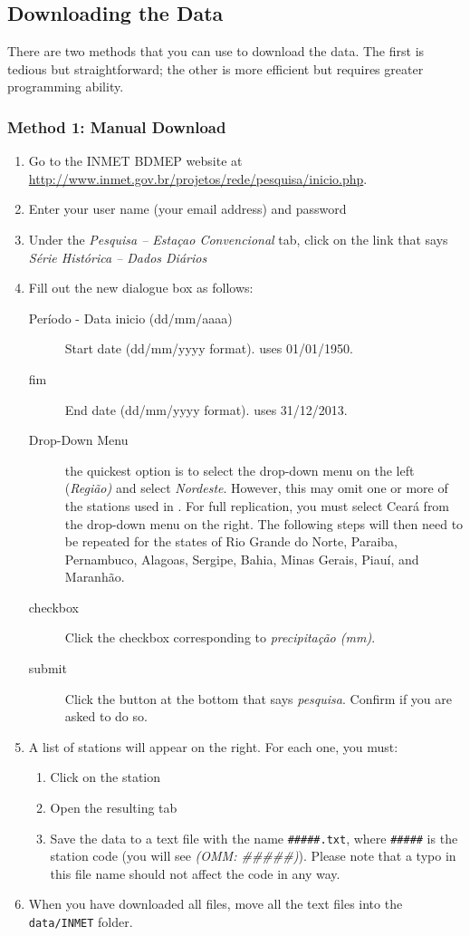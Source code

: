\documentclass[11pt]{article} %
\newcommand{\fn}[1]{\texttt{#1}} %
\newcommand{\code}[1]{\texttt{#1}} %
\newcommand{\usee}[1]{\textit{#1}} %
\begin{document}
\subsection{Downloading the Data}

There are two methods that you can use to download the data.
The first is tedious but straightforward; the other is more efficient but requires greater programming ability.

\subsubsection{Method 1: Manual Download}
\begin{enumerate}
\item Go to the \ac{INMET} \ac{BDMEP} website at \url{http://www.inmet.gov.br/projetos/rede/pesquisa/inicio.php}.
\item Enter your user name (your email address) and password
\item Under the \usee{Pesquisa -- Esta\c{c}ao Convencional} tab, click on the link that says \usee{S\'{e}rie Hist\'{o}rica -- Dados Di\'{a}rios}

\item Fill out the new dialogue box as follows:
\begin{description}
\item[Per\'{i}odo - Data inicio (dd/mm/aaaa)] Start date (dd/mm/yyyy format). \citet{dossgollin2015} uses 01/01/1950.
\item[fim] End date (dd/mm/yyyy format). \citet{dossgollin2015} uses 31/12/2013.
\item[Drop-Down Menu] the quickest option is to select the drop-down menu on the left (\usee{Regi\~{a}o)} and select \usee{Nordeste}. However, this may omit one or more of the stations used in \cite{dossgollin2015}. For full replication, you must select Cear\'{a} from the drop-down menu on the right. The following steps will then need to be repeated for the states of Rio Grande do Norte, Paraiba, Pernambuco, Alagoas, Sergipe, Bahia, Minas Gerais, Piau\'{i}, and Maranh\~{a}o.
\item[checkbox] Click the checkbox corresponding to \usee{precipita\c{c}\~{a}o (mm)}.
\item[submit] Click the button at the bottom that says \usee{pesquisa}. Confirm if you are asked to do so.
\end{description}

\item A list of stations will appear on the right. For each one, you must:
\begin{enumerate}
\item Click on the station
\item Open the resulting tab
\item Save the data to a text file with the name \code{\#\#\#\#\#.txt}, where \code{\#\#\#\#\#} is the station code (you will see \usee{(OMM: \#\#\#\#\#)}). Please note that a typo in this file name should not affect the code in any way.
\end{enumerate}
\item When you have downloaded all files, move all the text files into the \fn{data/INMET} folder. 
\end{enumerate}
\end{document}

